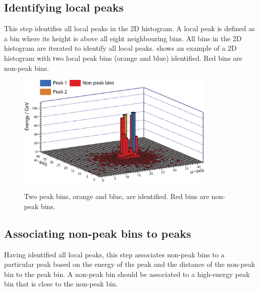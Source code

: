 
\subsection{Identifying local peaks}

This step identifies all local peaks in the 2D histogram. A local peak is defined as a bin where its height is above all eight neighbouring bins. All bins in the 2D histogram are  iterated to identify all local peaks.  shows an example of a 2D histogram with two local peak bins (orange and blue) identified. Red bins are non-peak bins.




\begin{figure}[tbph]
\centering
{\includegraphics[width=0.85\textwidth]{photon/peakFindingPeakOnly}}
\caption[Example of projecting a large photon cluster containing two photons.]
{Two peak bins, orange and blue, are identified. Red bins are non-peak bins.}
\label{fig:photonPeakFindingPeakOnly}
\end{figure}


\subsection{Associating non-peak bins to peaks}

Having identified all local peaks, this step associates non-peak bins to a particular peak based on the energy of the peak and the distance of the non-peak bin to the peak bin. A non-peak bin should be associated to a high-energy peak bin that is close to the non-peak bin.

